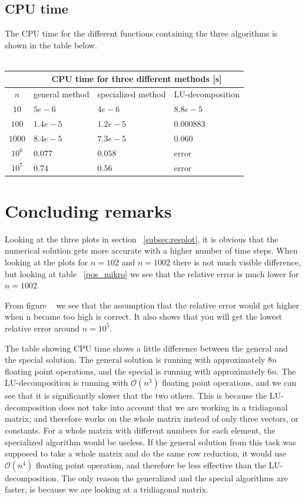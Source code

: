 \documentclass[a4paper,norsk,12pt,oneside]{article}
\begin{document}
\subsection{CPU time}

The CPU time for the different functions containing the three
algorithms is shown in the table below.\\\\ 

\begin{tabular}{c | l | l | l }
    & \multicolumn{3}{|c|}{CPU time for three different methods [s]} \\ 
    \hline
    \(n\) & general method & specialized method & LU-decomposition\\
    \hline
    \(10\) & \(5e-6\) & \(4e-6\) & \(8.8e-5\) \\
    \(100\) & \(1.4e-5\) & \(1.2e-5\) & \(0.000883\) \\
    \(1000\) & \(8.4e-5\) & \(7.3e-5\) & \(0.060\) \\
    \(10^6\) & \(0.077\) & \(0.058\) & error \\
    \(10^7\) & \(0.74\) & \(0.56\) & error\\
    \hline
    \end{tabular} 

\section{Concluding remarks}

Looking at the three plots in section ~\ref{subsec:resplot}, it is obvious
that the numerical solution gets more accurate with a higher number of time steps. 
When looking at the plots for \(n = 102\) and \(n = 1002\) there is not much visible 
difference, but looking at table ~\ref{pos_mikro} we see that the relative error 
is much lower for \(n = 1002\). 

From figure ~ we see that the assumption that the relative error
would get higher when n became too high is correct. It also shows that you will
get the lowest relative error around \(n = 10^5\). 

The table showing CPU time shows a little difference between the general and the
special solution. The general solution is running with approximately \(8n\) floating point 
operations, and the special is running with approximately \(6n\). 
The LU-decomposition is running with \(\mathcal{O}(n^3)\) floating point operations, and we can see
that it is significantly slower that the two others. 
This is because the LU-decomposition does not take into account that we are working
in a tridiagonal matrix, and therefore works on the whole matrix instead of only 
three vectors, or constants.
For a whole matrix with different numbers for each element, the specialized algorithm 
would be useless.
If the general solution from this task was supposed to take a whole matrix and do
the same row reduction, it would use \(\mathcal{O}(n^4)\) floating point operation,
and therefore be less effective than the LU-decomposition. 
The only reason the generalized and the special algorithms are faster, is because
we are looking at a tridiagonal matrix. 
\end{document}
